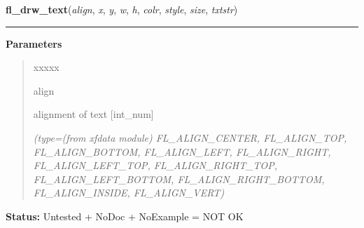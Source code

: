\hspace{.8\funcindent}\begin{boxedminipage}{\funcwidth}

    \raggedright \textbf{fl\_drw\_text}(\textit{align}, \textit{x}, \textit{y}, \textit{w}, \textit{h}, \textit{colr}, \textit{style}, \textit{size}, \textit{txtstr})

    \vspace{-1.5ex}

    \rule{\textwidth}{0.5\fboxrule}
\setlength{\parskip}{2ex}
\setlength{\parskip}{1ex}
      \textbf{Parameters}
      \vspace{-1ex}

      \begin{quote}
        \begin{Ventry}{xxxxx}

          \item[align]

          alignment of text [int\_num]

            {\it (type=(from xfdata module) FL\_ALIGN\_CENTER, FL\_ALIGN\_TOP, FL\_ALIGN\_BOTTOM, 
FL\_ALIGN\_LEFT, FL\_ALIGN\_RIGHT, FL\_ALIGN\_LEFT\_TOP, 
FL\_ALIGN\_RIGHT\_TOP, FL\_ALIGN\_LEFT\_BOTTOM, FL\_ALIGN\_RIGHT\_BOTTOM, 
FL\_ALIGN\_INSIDE, FL\_ALIGN\_VERT)}

        \end{Ventry}

      \end{quote}

\textbf{Status:} Untested + NoDoc + NoExample = NOT OK



    \end{boxedminipage}

    \label{xformslib:library:fl_drw_text_beside}

    \vspace{0.5ex}

